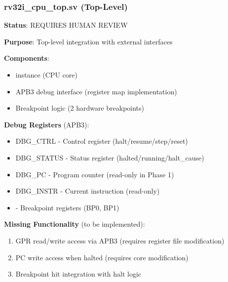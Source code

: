 \subsubsection{\texorpdfstring{rv32i\_\allowbreak{}cpu\_\allowbreak{}top.sv
(Top-Level)}{rv32i\_cpu\_top.sv (Top-Level)}}\label{cr:fix:cpu-integration-summary:rv32i-cpu-topsv-top-level}

\begin{record}

\textbf{Status}: \warn{} REQUIRES HUMAN REVIEW

\textbf{Purpose}: Top-level integration with external interfaces

\textbf{Components}:

\begin{itemize}
\tightlist
\item
   instance (CPU core)
\item
  APB3 debug interface (register map implementation)
\item
  Breakpoint logic (2 hardware breakpoints)
\end{itemize}

\textbf{Debug Registers} (APB3):

\begin{itemize}
\tightlist
\item
   DBG\_CTRL - Control register
  (halt/\allowbreak{}resume/\allowbreak{}step/\allowbreak{}reset)
\item
   DBG\_\allowbreak{}STATUS - Status register
  (halted/\allowbreak{}running/\allowbreak{}halt\_\allowbreak{}cause)
\item
   DBG\_PC - Program counter (read-only in Phase 1)
\item
   DBG\_INSTR - Current instruction (read-only)
\item
   - Breakpoint registers (BP0, BP1)
\end{itemize}

\textbf{Missing Functionality} (to be implemented):

\begin{enumerate}
\def\labelenumi{\arabic{enumi}.}
\tightlist
\item
  GPR read/\allowbreak{}write access via APB3 (requires register file
  modification)
\item
  PC write access when halted (requires core modification)
\item
  Breakpoint hit integration with halt logic
\end{enumerate}


\end{record}
